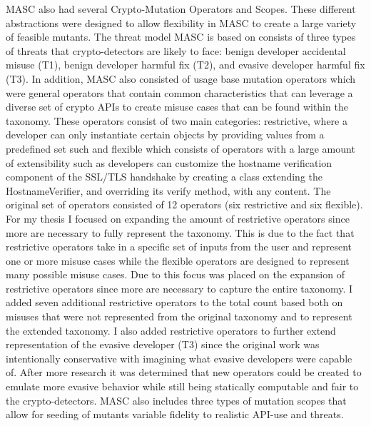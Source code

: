MASC also had several Crypto-Mutation Operators and Scopes. These different abstractions were designed to allow flexibility in MASC to create a large variety of feasible mutants. The threat model MASC is based on consists of three types of threats that crypto-detectors are likely to face: benign developer accidental misuse (T1), benign developer harmful fix (T2), and evasive developer harmful fix (T3). In addition, MASC also consisted of usage base mutation operators which were general operators that contain common characteristics that can leverage a diverse set of crypto APIs to create misuse cases that can be found within the taxonomy. These operators consist of two main categories: restrictive, where a developer can only instantiate certain objects by providing values from a predefined set such  and flexible which consists of operators with a large amount of extensibility such as developers can customize the hostname verification component of the SSL/TLS handshake by creating a class extending the HostnameVerifier, and overriding its verify method, with any content. The original set of operators consisted of 12 operators (six restrictive and six flexible). For my thesis I focused on expanding the amount of restrictive operators since more are necessary to fully represent the taxonomy.  This is due to the fact that restrictive operators take in a specific set of inputs from the user and represent one or more misuse cases while the flexible operators are designed to represent many possible misuse cases. Due to this focus was placed on the expansion of restrictive operators since more are necessary to capture the entire taxonomy. I added seven additional restrictive operators to the total count based both on misuses that were not represented from the original taxonomy and to represent the extended taxonomy. I also added restrictive operators to further extend representation of the evasive developer (T3) since the original work was intentionally conservative with imagining what evasive developers were capable of. After more research it was determined that new operators could be created to emulate more evasive behavior while still being statically computable and fair to the crypto-detectors. MASC also includes three types of mutation scopes that allow for seeding of mutants variable fidelity to realistic API-use and threats.

